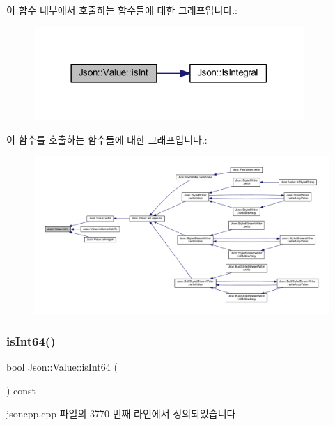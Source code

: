 이 함수 내부에서 호출하는 함수들에 대한 그래프입니다.\+:\nopagebreak
\begin{figure}[H]
\begin{center}
\leavevmode
\includegraphics[width=290pt]{class_json_1_1_value_aff51d8b52979ca06cf9d909accd5f695_cgraph}
\end{center}
\end{figure}
이 함수를 호출하는 함수들에 대한 그래프입니다.\+:\nopagebreak
\begin{figure}[H]
\begin{center}
\leavevmode
\includegraphics[width=350pt]{class_json_1_1_value_aff51d8b52979ca06cf9d909accd5f695_icgraph}
\end{center}
\end{figure}
\mbox{\label{class_json_1_1_value_a4a81fb3c3acdbb68b2e2f30836a4f53e}} 
\subsubsection{\texorpdfstring{is\+Int64()}{isInt64()}}
{\footnotesize\ttfamily bool Json\+::\+Value\+::is\+Int64 (\begin{DoxyParamCaption}{ }\end{DoxyParamCaption}) const}



jsoncpp.\+cpp 파일의 3770 번째 라인에서 정의되었습니다.


